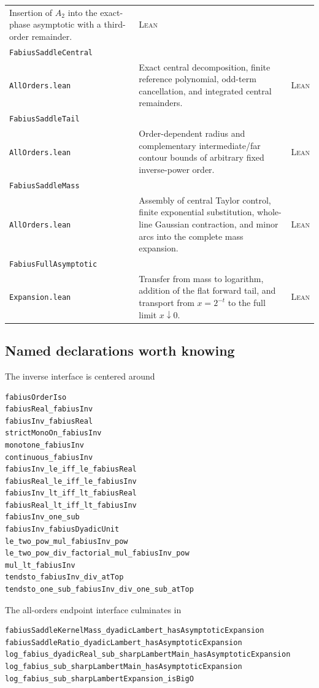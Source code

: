 \documentclass[11pt,oneside]{article}
\theoremstyle{definition}
\theoremstyle{remark}
\newcommand{\Formalized}{\textsc{Lean}}
\begin{document}
\begin{longtable}{>{\raggedright\arraybackslash}p{}
                  >{\raggedright\arraybackslash}p{}
                  >{\raggedright\arraybackslash}p{}}
Insertion of $A_2$ into the exact-phase asymptotic with a
third-order remainder. & \Formalized\\
\texttt{FabiusSaddleCentral}\\\texttt{AllOrders.lean} &
Exact central decomposition, finite reference polynomial, odd-term
cancellation, and integrated central remainders. & \Formalized\\
\texttt{FabiusSaddleTail}\\\texttt{AllOrders.lean} &
Order-dependent radius and complementary intermediate/far contour bounds
of arbitrary fixed inverse-power order. & \Formalized\\
\texttt{FabiusSaddleMass}\\\texttt{AllOrders.lean} &
Assembly of central Taylor control, finite exponential substitution,
whole-line Gaussian contraction, and minor arcs into the complete mass
expansion. & \Formalized\\
\texttt{FabiusFullAsymptotic}\\\texttt{Expansion.lean} &
Transfer from mass to logarithm, addition of the flat forward tail, and
transport from $x=2^{-t}$ to the full limit $x\downarrow0$. & \Formalized\\
\bottomrule
\end{longtable}
\endgroup

\subsection{Named declarations worth knowing}

The inverse interface is centered around
\begin{lstlisting}[style=pseudo]
fabiusOrderIso
fabiusReal_fabiusInv
fabiusInv_fabiusReal
strictMonoOn_fabiusInv
monotone_fabiusInv
continuous_fabiusInv
fabiusInv_le_iff_le_fabiusReal
fabiusReal_le_iff_le_fabiusInv
fabiusInv_lt_iff_lt_fabiusReal
fabiusReal_lt_iff_lt_fabiusInv
fabiusInv_one_sub
fabiusInv_fabiusDyadicUnit
le_two_pow_mul_fabiusInv_pow
le_two_pow_div_factorial_mul_fabiusInv_pow
mul_lt_fabiusInv
tendsto_fabiusInv_div_atTop
tendsto_one_sub_fabiusInv_div_one_sub_atTop
\end{lstlisting}
The all-orders endpoint interface culminates in
\begin{lstlisting}[style=pseudo]
fabiusSaddleKernelMass_dyadicLambert_hasAsymptoticExpansion
fabiusSaddleRatio_dyadicLambert_hasAsymptoticExpansion
log_fabius_dyadicReal_sub_sharpLambertMain_hasAsymptoticExpansion
log_fabius_sub_sharpLambertMain_hasAsymptoticExpansion
log_fabius_sub_sharpLambertExpansion_isBigO
\end{lstlisting}
\end{document}
